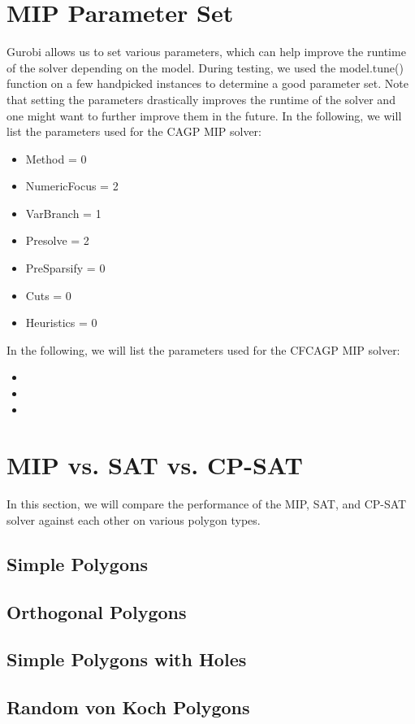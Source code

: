 \section{MIP Parameter Set}
Gurobi allows us to set various parameters, which can help improve the runtime of the solver depending on the model. During testing, we used the model.tune() function on a few handpicked instances to determine a good parameter set. Note that setting the parameters drastically improves the runtime of the solver and one might want to further improve them in the future. In the following, we will list the parameters used for the CAGP MIP solver:
\begin{itemize}
  \item Method = 0
  \item NumericFocus = 2
  \item VarBranch = 1
  \item Presolve = 2
  \item PreSparsify = 0
  \item Cuts = 0
  \item Heuristics = 0
\end{itemize}
In the following, we will list the parameters used for the CFCAGP MIP solver:
\begin{itemize}
  \item 
  \item 
  \item 
\end{itemize}

\section{MIP vs. SAT vs. CP-SAT}
In this section, we will compare the performance of the MIP, SAT, and CP-SAT solver against each other on various polygon types.

\subsection{Simple Polygons}



\subsection{Orthogonal Polygons}

\subsection{Simple Polygons with Holes}

\subsection{Random von Koch Polygons}
